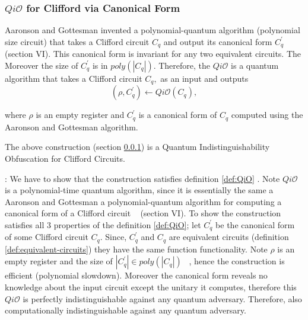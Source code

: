 \subsubsection{$Qi\mathcal{O}$ for Clifford via Canonical Form}
\label{sec:Clifford-iO-canonical}
Aaronson and Gottesman invented a polynomial-quantum algorithm (polynomial size circuit) that takes a Clifford circuit $C_q$ and output its canonical form $C_q^\prime$  ~\cite{AG04} (section VI). This canonical form is invariant for any two equivalent circuits. The Moreover the size of $C_q^\prime$ is in $poly(|C_q|).$ Therefore, the $Qi\mathcal{O}$ is a quantum algorithm that takes a Clifford circuit $C_q,$ as an input and outputs   
														$$(\rho, C_q^\prime)\leftarrow Qi\mathcal{O}(C_q),$$
   
where $\rho$ is an empty register and $C_q^\prime$ is a canonical form of $C_q$ computed using the Aaronson and Gottesman algorithm.

 \begin{lemma}                                                
The above construction (section \ref{sec:Clifford-iO-canonical}) is a Quantum Indistinguishability Obfuscation for Clifford Circuits.
\end{lemma}

: We have to show that the construction satisfies definition \ref{def:QiO} . Note $Qi\mathcal{O}$ is a polynomial-time quantum algorithm, since it is essentially the same a Aaronson and Gottesman a polynomial-quantum algorithm for computing a canonical form of a Clifford circuit ~\cite{AG04} (section VI). 
To show the construction satisfies all 3 properties of the definition \ref{def:QiO}; let $C_q^\prime$ be the canonical form of some Clifford circuit $C_q.$  Since, $C_q^\prime$ and $C_q$ are equivalent circuits (definition \ref{def:equivalent-circuits}) they have the same function functionality. Note $\rho$ is an empty register and the size of $|C_q^\prime| \in poly(|C_q|)$ ~\cite{AG04}, hence the construction is efficient (polynomial slowdown). Moreover the canonical form reveals no knowledge about the input circuit except the unitary it computes, therefore this $Qi\mathcal{O}$ is perfectly indistinguishable against any quantum adversary. Therefore, also computationally indistinguishable against any quantum adversary.

